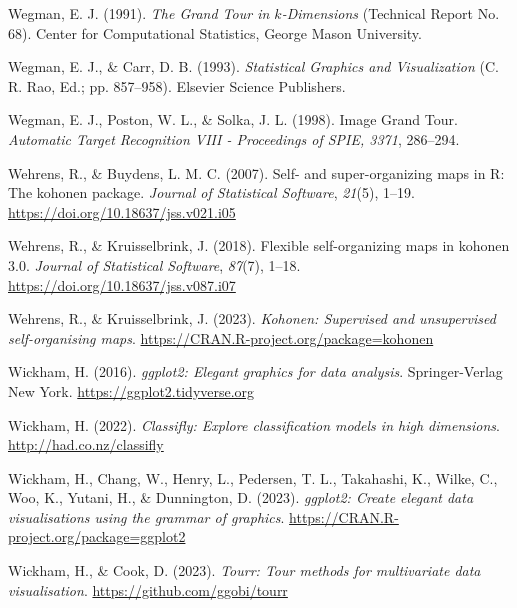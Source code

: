 \documentclass[
  letterpaper,
]{krantz}
\newlength{\cslhangindent}
\newlength{\cslentryspacingunit} %
\newenvironment{CSLReferences}[2] %
 {%
  \setlength{\parindent}{0pt}
  \ifodd #1
  \let\oldpar\par
  \def\par{\hangindent=\cslhangindent\oldpar}
  \fi
  \setlength{\parskip}{#2\cslentryspacingunit}
 }%
 {}
\begin{document}
\begin{CSLReferences}{1}{0}
\leavevmode{}%
Wegman, E. J. (1991). \emph{The {G}rand {T}our in \(k\)-{D}imensions}
(Technical Report No. 68). Center for Computational Statistics, George
Mason University.

\leavevmode{}%
Wegman, E. J., \& Carr, D. B. (1993). \emph{{S}tatistical {G}raphics and
{V}isualization} (C. R. Rao, Ed.; pp. 857--958). Elsevier Science
Publishers.

\leavevmode{}%
Wegman, E. J., Poston, W. L., \& Solka, J. L. (1998). Image {G}rand
{T}our. \emph{Automatic Target Recognition VIII - Proceedings of SPIE,
3371}, 286--294.

\leavevmode{}%
Wehrens, R., \& Buydens, L. M. C. (2007). Self- and super-organizing
maps in {R}: The {kohonen} package. \emph{Journal of Statistical
Software}, \emph{21}(5), 1--19.
\url{https://doi.org/10.18637/jss.v021.i05}

\leavevmode{}%
Wehrens, R., \& Kruisselbrink, J. (2018). Flexible self-organizing maps
in {kohonen} 3.0. \emph{Journal of Statistical Software}, \emph{87}(7),
1--18. \url{https://doi.org/10.18637/jss.v087.i07}

\leavevmode{}%
Wehrens, R., \& Kruisselbrink, J. (2023). \emph{Kohonen: Supervised and
unsupervised self-organising maps}.
\url{https://CRAN.R-project.org/package=kohonen}

\leavevmode{}%
Wickham, H. (2016). \emph{ggplot2: Elegant graphics for data analysis}.
Springer-Verlag New York. \url{https://ggplot2.tidyverse.org}

\leavevmode{}%
Wickham, H. (2022). \emph{Classifly: Explore classification models in
high dimensions}. \url{http://had.co.nz/classifly}

\leavevmode{}%
Wickham, H., Chang, W., Henry, L., Pedersen, T. L., Takahashi, K.,
Wilke, C., Woo, K., Yutani, H., \& Dunnington, D. (2023). \emph{ggplot2:
Create elegant data visualisations using the grammar of graphics}.
\url{https://CRAN.R-project.org/package=ggplot2}

\leavevmode{}%
Wickham, H., \& Cook, D. (2023). \emph{Tourr: Tour methods for
multivariate data visualisation}. \url{https://github.com/ggobi/tourr}


\end{CSLReferences}
\end{document}
